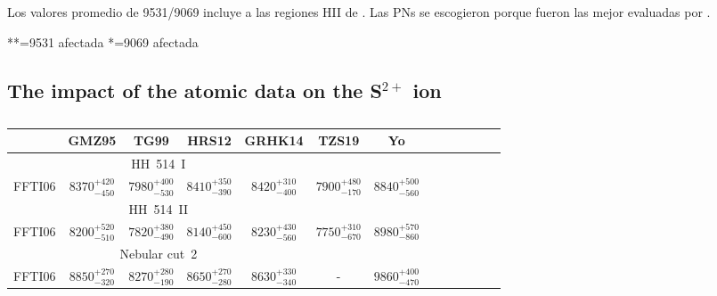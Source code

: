 \documentclass[fleqn,usenatbib]{mnras}
\begin{document}
Los valores promedio de 9531/9069 incluye a las regiones HII de \citet{Vital18}. Las PNs se escogieron porque fueron las mejor evaluadas por \citet{rodriguez20}.


**=9531 afectada
*=9069 afectada








\subsection{The impact of the atomic data on the S$^{2+}$ ion }
\label{subsec:atomic_data_siii}



\begin{table}
\centering
\caption{}
\label{tab:atomic_data_tempsiii}
\begin{adjustbox}{width=\textwidth}
\begin{tabular}{ccccccccccccc}
\hline
 &  GMZ95 & TG99 & HRS12 & GRHK14 & TZS19 & Yo\\
\hline
\multicolumn{5}{c}{HH~514~I} \\
 

FFTI06  & $8370^{+420} _{-450}$ & $7980^{+400} _{-530}$ & $8410^{+350} _{-390}$ & $8420^{+310} _{-400}$ & $7900^{+480} _{-170}$ & $8840^{+500} _{-560}$ \\


\multicolumn{5}{c}{HH~514~II} \\



FFTI06 & $8200^{+520} _{-510}$ & $7820^{+380} _{-490}$ & $8140^{+450} _{-600}$& $8230^{+430} _{-560}$ &$7750^{+310} _{-670}$ & $8980^{+570} _{-860}$\\

\multicolumn{5}{c}{Nebular cut~2} \\


FFTI06 & $8850^{+270} _{-320}$ & $8270^{+280} _{-190}$ & $8650^{+270} _{-280}$ & $8630^{+330} _{-340}$ & - & $9860^{+400} _{-470}$\\


\hline
\end{tabular}
\end{adjustbox}
\end{table}
\end{document}

